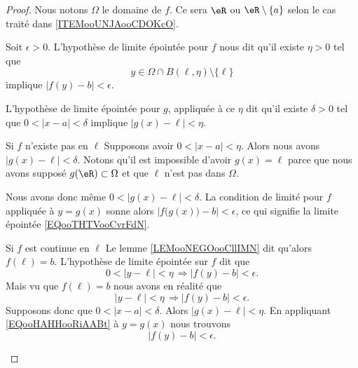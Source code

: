 \begin{proof}
    Nous notons \( \Omega\) le domaine de \( f\). Ce sera \( \eR\) ou \( \eR\setminus\{ a \}\) selon le cas traité dans \ref{ITEMooUNJAooCDOKcO}.

    Soit \( \epsilon>0\). L'hypothèse de limite épointée pour \( f\) nous dit qu'il existe \( \eta>0\) tel que 
    \begin{equation}
       y\in\Omega\cap B(\ell,\eta)\setminus\{ \ell \}
    \end{equation}
    implique \( | f(y)-b |<\epsilon\).

    L'hypothèse de limite épointée pour \( g\), appliquée à ce \( \eta\) dit qu'il existe \( \delta>0\) tel que \( 0<| x-a |<\delta\) implique \( | g(x)-\ell |<\eta\).

    \begin{subproof}
        \item[Si \( f\) n'existe pas en \( \ell\)]
            Supposons avoir \( 0<| x-a |<\eta\). Alors nous avons \( | g(x)-\ell |<\delta\). Notons qu'il est impossible d'avoir \( g(x)=\ell\) parce que nous avons supposé \( g(\eR)\subset \Omega\) et que \( \ell\) n'est pas dans \( \Omega\).

            Nous avons donc même \( 0<| g(x)-\ell |<\delta\). La condition de limité pour \( f\) appliquée à \( y=g(x)\) sonne alors \( | f\big( g(x) \big)-b |<\epsilon\), ce qui signifie la limite épointée \eqref{EQooTHTVooCvrFdN}.
        \item[Si \( f\) est continue en \( \ell\)]
            Le lemme \ref{LEMooNEGOooCllIMN} dit qu'alors \( f(\ell)=b\). L'hypothèse de limite épointée sur \( f\) dit que 
            \begin{equation}
                0<| y-\ell |<\eta\,\Rightarrow | f(y)-b |<\epsilon.
            \end{equation} 
            Mais vu que \( f(\ell)=b\) nous avons en réalité que
            \begin{equation}        \label{EQooHAHHooRiAABt}
                | y-\ell |<\eta\,\Rightarrow | f(y)-b |<\epsilon.
            \end{equation} 
            Supposons donc que \( 0<|x-a  |<\delta\). Alors \( | g(x)-\ell |<\eta\). En appliquant \eqref{EQooHAHHooRiAABt} à \( y=g(x)\) nous trouvons
            \begin{equation}
                | f(y)-b |<\epsilon.
            \end{equation}
    \end{subproof}
\end{proof}

